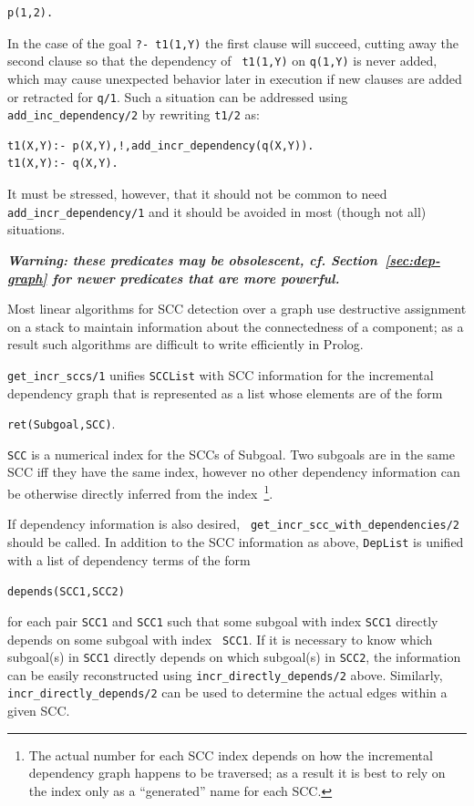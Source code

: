 \begin{description}
\begin{itemize}
\begin{verbatim}
p(1,2).
\end{verbatim}
In the case of the goal {\tt ?- t1(1,Y)} the first clause will
succeed, cutting away the second clause so that the dependency of {\tt
  t1(1,Y)} on {\tt q(1,Y)} is never added, which may cause unexpected
behavior later in execution if new clauses are added or retracted for
{\tt q/1}.  Such a situation can be addressed using {\tt
  add\_inc\_dependency/2} by rewriting {\tt t1/2} as:
\begin{verbatim}
t1(X,Y):- p(X,Y),!,add_incr_dependency(q(X,Y)).
t1(X,Y):- q(X,Y).
\end{verbatim}
It must be stressed, however, that it should not be common to need {\tt
  add\_incr\_dependency/1} and it should be avoided in most (though not all) situations.

%

{\bf {\em Warning: these predicates may be obsolescent, cf.
    Section~\ref{sec:dep-graph} for newer predicates that are more
    powerful.}}

Most linear algorithms for SCC detection over a graph use destructive
assignment on a stack to maintain information about the connectedness
of a component; as a result such algorithms are
difficult to write efficiently in Prolog.

{\tt get\_incr\_sccs/1} unifies {\tt SCCList} with SCC information for
the incremental dependency graph that is represented as a list whose
elements are of the form
\begin{center}
{\tt ret(Subgoal,SCC)}.
\end{center}
{\tt SCC} is a numerical index for the SCCs of Subgoal. Two subgoals
are in the same SCC iff they have the same index, however no other
dependency information can be otherwise directly inferred from the
index~\footnote{The actual number for each SCC index depends on how
  the incremental dependency graph happens to be traversed; as a
  result it is best to rely on the index only as a ``generated'' name
  for each SCC.}.

If dependency information is also desired, {\tt
  get\_incr\_scc\_with\_dependencies/2} should be called.  In addition
to the SCC information as above, {\tt DepList} is unified with a list
of dependency terms of the form
\begin{center}
{\tt depends(SCC1,SCC2)}
\end{center}
for each pair {\tt SCC1} and {\tt SCC1} such that some subgoal with
index {\tt SCC1} directly depends on some subgoal with index {\tt
  SCC1}.  If it is necessary to know which subgoal(s) in {\tt SCC1}
directly depends on which subgoal(s) in {\tt SCC2}, the information
can be easily reconstructed using {\tt incr\_directly\_depends/2}
above.  Similarly, {\tt incr\_directly\_depends/2} can be used to
determine the actual edges within a given SCC.


\end{itemize}
\end{description}
